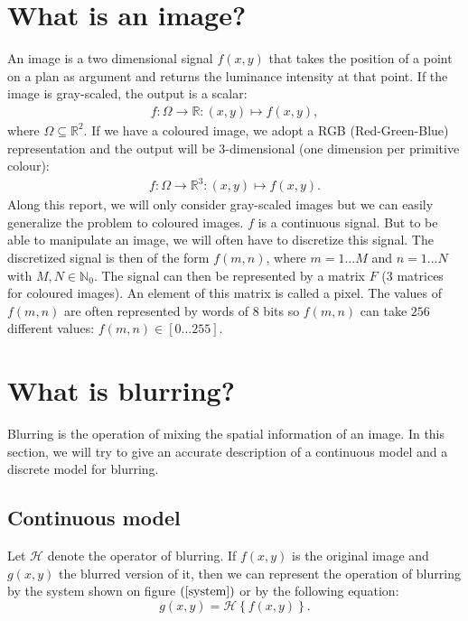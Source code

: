 \label{mathModel}
\section{What is an image?}

An image is a two dimensional signal $f(x,y)$ that takes the position of a point on a plan as argument and returns the luminance intensity at that point. If the image is gray-scaled, the output is a scalar:
\begin{eqnarray}
f:\Omega \rightarrow \mathbb{R}: (x,y) \mapsto f(x,y),
\end{eqnarray}
where $\Omega \subseteq \mathbb{R}^2$. If we have a coloured image, we adopt a RGB (Red-Green-Blue) representation and the output will be 3-dimensional (one dimension per primitive colour):
\begin{eqnarray}
f:\Omega \rightarrow \mathbb{R}^3 : (x,y) \mapsto f(x,y).
\end{eqnarray}
Along this report, we will only consider gray-scaled images but we can easily generalize the problem to coloured images. $f$ is a continuous signal. But to be able to manipulate an image, we will often have to discretize this signal. The discretized signal is then of the form $f(m,n)$, where $m=1...M$ and $n=1...N$ with $M,N \in \mathbb{N}_0$. The signal can then be represented by a matrix $F$ (3 matrices for coloured images). An element  of this matrix is called a pixel. The values of $f(m,n)$ are often represented by words of $8$ bits so $f(m,n)$ can take $256$ different values: $f(m,n) \in \left[0...255\right]$.

\section{What is blurring?}

Blurring is the operation of mixing the spatial information of an image. In this section, we will try to give an accurate description of a continuous model and a discrete model for blurring.

\subsection{Continuous model}

Let $\mathcal{H}$ denote the operator of blurring. If $f(x,y)$ is the original image and $g(x,y)$ the blurred version of it, then we can represent the operation of blurring by the system shown on figure $(\ref{system})$ or by the following equation:
\begin{equation}
g(x,y) = \mathcal{H}\left\lbrace f(x,y) \right\rbrace.
\end{equation}

